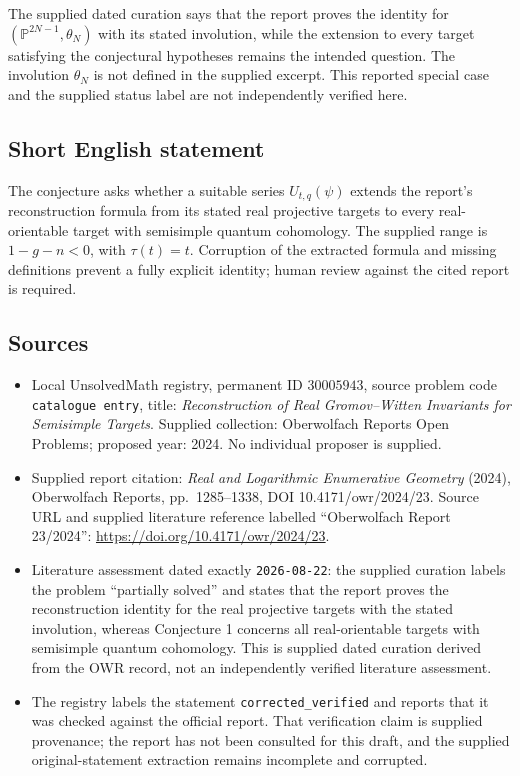 \documentclass[11pt]{article}
\begin{document}
The supplied dated curation says that the report proves the identity for \((\mathbb P^{2N-1},\theta_N)\) with its stated involution, while the extension to every target satisfying the conjectural hypotheses remains the intended question. The involution \(\theta_N\) is not defined in the supplied excerpt. This reported special case and the supplied status label are not independently verified here.
\subsection{Short English statement}
The conjecture asks whether a suitable series \(U_{t,q}(\psi)\) extends the report's reconstruction formula from its stated real projective targets to every real-orientable target with semisimple quantum cohomology. The supplied range is \(1-g-n<0\), with \(\tau(t)=t\). Corruption of the extracted formula and missing definitions prevent a fully explicit identity; human review against the cited report is required.
\subsection{Sources}
\begin{itemize}
\item Local UnsolvedMath registry, permanent ID \(30005943\), source problem code \texttt{catalogue entry}, title: \emph{Reconstruction of Real Gromov--Witten Invariants for Semisimple Targets}. Supplied collection: Oberwolfach Reports Open Problems; proposed year: 2024. No individual proposer is supplied.
\item Supplied report citation: \emph{Real and Logarithmic Enumerative Geometry} (2024), Oberwolfach Reports, pp.~1285--1338, DOI 10.4171/owr/2024/23. Source URL and supplied literature reference labelled ``Oberwolfach Report 23/2024'': \url{https://doi.org/10.4171/owr/2024/23}.
\item Literature assessment dated exactly \texttt{2026-08-22}: the supplied curation labels the problem ``partially solved'' and states that the report proves the reconstruction identity for the real projective targets with the stated involution, whereas Conjecture 1 concerns all real-orientable targets with semisimple quantum cohomology. This is supplied dated curation derived from the OWR record, not an independently verified literature assessment.
\item The registry labels the statement \texttt{corrected\_verified} and reports that it was checked against the official report. That verification claim is supplied provenance; the report has not been consulted for this draft, and the supplied original-statement extraction remains incomplete and corrupted.
\end{itemize}
\end{document}
